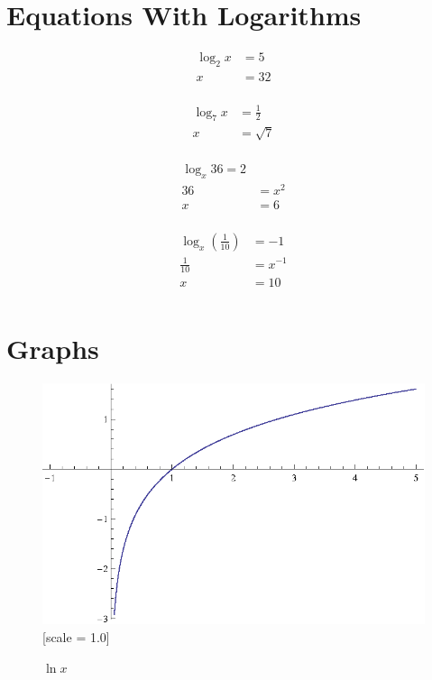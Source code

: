 \documentclass{exam}
\begin{document}
  \section{Equations With Logarithms}
  \begin{align*}
    \log_2 x &= 5 \\
    x        &= 32 \\
  \end{align*}
  
  \begin{align*}
    \log_7 x &= \frac{1}{2} \\
    x        &= \sqrt{7} \\
  \end{align*}

  \begin{align*}
    \log_x 36 = 2 \\
    36               &= x^2 \\
    x                &= 6 \\
  \end{align*}

  \begin{align*}
    \log_x \left( \frac{1}{10} \right) &= -1 \\
    \frac{1}{10}                       &= x^{-1} \\
    x                                  &= 10 \\
  \end{align*}

  \section{Graphs}

  \begin{figure}[H]
    \centering
    \includegraphics{figure1.eps}[scale = 1.0]
    \caption{$\ln x$}
  \end{figure}
\end{document}
